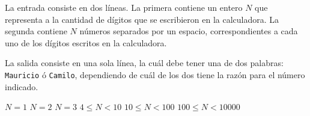 \documentclass{oci}
\begin{document}
\begin{inputDescription}
  La entrada consiste en dos líneas.
  La primera contiene un entero $N$ que representa a la cantidad de dígitos que
  se escribieron en la calculadora.
  La segunda contiene $N$ números separados por un espacio, correspondientes a
  cada uno de los dígitos escritos en la calculadora.
\end{inputDescription}

\begin{outputDescription}
La salida consiste en una sola línea, la cuál debe tener una de dos palabras:
\texttt{Mauricio} ó \texttt{Camilo}, dependiendo de cuál de los dos tiene la
razón para el número indicado.
\end{outputDescription}

\begin{scoreDescription}
   $ N = 1$
   $ N = 2$
   $ N = 3$
   $ 4 \leq N < 10$
   $ 10 \leq N < 100$
   $ 100 \leq N < 10000$
\end{scoreDescription}

\begin{sampleDescription}
\end{sampleDescription}
\end{document}

